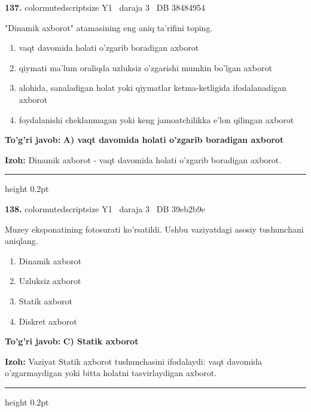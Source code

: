 \documentclass[10pt,a4paper,oneside]{article}
\begin{document}
\noindent\textbf{\color{ink}137.}  {color{muted}scriptsize Y1 \textbullet\ daraja 3 \textbullet\ DB 38484954}
\par
"Dinamik axborot" atamasining eng aniq ta'rifini toping.
\begin{enumerate}[label=\Alph*),leftmargin=9mm]
\item vaqt davomida holati o'zgarib boradigan axborot
\item qiymati ma'lum oraliqda uzluksiz o'zgarishi mumkin bo'lgan axborot
\item alohida, sanaladigan holat yoki qiymatlar ketma-ketligida ifodalanadigan axborot
\item foydalanishi cheklanmagan yoki keng jamoatchilikka e'lon qilingan axborot
\end{enumerate}
\begin{tcolorbox}[enhanced,breakable,colback=teal!4,colframe=teal!50!black,boxrule=0.5pt,arc=1.1mm,left=3mm,right=3mm,top=1.7mm,bottom=1.7mm,before skip=2mm,after skip=2mm]
\textbf{\color{teal}To'g'ri javob:} \textbf{A) vaqt davomida holati o'zgarib boradigan axborot}
\par\smallskip
\textbf{Izoh:} Dinamik axborot - vaqt davomida holati o'zgarib boradigan axborot.
\end{tcolorbox}
\vspace{2mm}\hrule height 0.2pt \vspace{3mm}

\noindent\textbf{\color{ink}138.}  {color{muted}scriptsize Y1 \textbullet\ daraja 3 \textbullet\ DB 39eb2b9e}
\par
Muzey eksponatining fotosurati ko'rsatildi. Ushbu vaziyatdagi asosiy tushunchani aniqlang.
\begin{enumerate}[label=\Alph*),leftmargin=9mm]
\item Dinamik axborot
\item Uzluksiz axborot
\item Statik axborot
\item Diskret axborot
\end{enumerate}
\begin{tcolorbox}[enhanced,breakable,colback=teal!4,colframe=teal!50!black,boxrule=0.5pt,arc=1.1mm,left=3mm,right=3mm,top=1.7mm,bottom=1.7mm,before skip=2mm,after skip=2mm]
\textbf{\color{teal}To'g'ri javob:} \textbf{C) Statik axborot}
\par\smallskip
\textbf{Izoh:} Vaziyat Statik axborot tushunchasini ifodalaydi: vaqt davomida o'zgarmaydigan yoki bitta holatni tasvirlaydigan axborot.
\end{tcolorbox}
\vspace{2mm}\hrule height 0.2pt \vspace{3mm}
\end{document}
